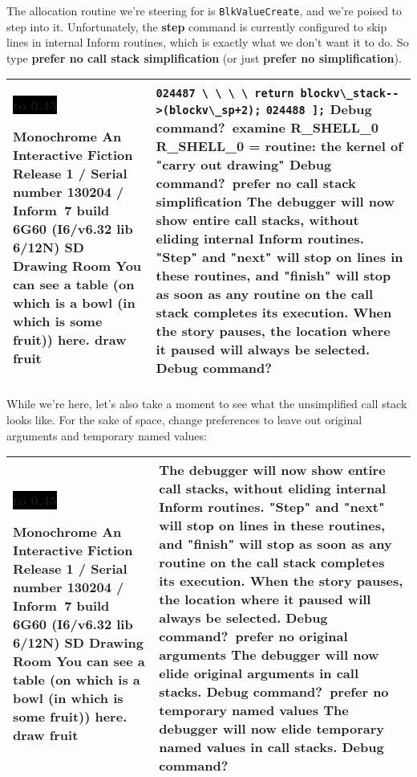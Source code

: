 \documentclass{book}
\newcommand{\n}{\hspace*{\fill}\newline}
\newcommand{\terp}[2]{\begin{center}\begin{tabular}{p{0.45\textwidth}|p{0.45\textwidth}}\midrule #1&#2\\\midrule\end{tabular}\end{center}}
\newcommand{\glkheading}[1]{\textbf{#1}}
\newcommand{\glkinput}[1]{\textbf{#1}}
\newcommand{\glkstatusline}[2]{\centerline{\colorbox{black}{\hbox to 0.45\textwidth{\textcolor{white}{#1\hfil #2}}}}}
\newcommand{\storyprompt}{\raisebox{1.5pt}{\(>\)}}
\newcommand{\cursor}{\raisebox{-1.5pt}{\RectangleThin}}
\newcommand{\unmarkedindent}{\hphantom{\(>\)}\qquad}
\newcommand{\unmarkedindentb}{\qquad\hphantom{\(>\)}}
\begin{document}
The allocation routine we're steering for is \lstinline{BlkValueCreate}, and
we're poised to step into it.  Unfortunately, the \glkinput{step} command is
currently configured to skip lines in internal Inform routines, which is exactly
what we don't want it to do.  So type \glkinput{prefer no call stack
  simplification} (or just \glkinput{prefer no simplification}).

\terp{\glkstatusline{Drawing Room}{0/1}\n
  \glkheading{Monochrome}\n
  An Interactive Fiction\n
  Release 1 / Serial number 130204 / Inform~7 build 6G60 (I6/v6.32 lib 6/12N) SD\n
  \n
  \glkheading{Drawing Room}\n
  You can see a table (on which is a bowl (in which is some fruit)) here.\n
  \n
  \storyprompt\glkinput{draw fruit}}{%
  \unmarkedindentb \lstinline{024487 \ \ \ \ return blockv\_stack-->(blockv\_sp+2);}\n
  \unmarkedindent \lstinline{024488 ];}\n
  \n
  Debug command?\ \glkinput{examine R\_SHELL\_0}\n
  \n
  R\_SHELL\_0 = routine: the kernel of "carry out drawing"\n
  \n
  Debug command?\ \glkinput{prefer no call stack simplification}\n
  \n
  The debugger will now show entire call stacks, without eliding internal Inform routines.  "Step" and "next" will stop on lines in these routines, and "finish" will stop as soon as any routine on the call stack completes its execution.  When the story pauses, the location where it paused will always be selected.\n
  \n
  Debug command?\ \cursor}

While we're here, let's also take a moment to see what the unsimplified call
stack looks like.  For the sake of space, change preferences to leave out
original arguments and temporary named values:

\terp{\glkstatusline{Drawing Room}{0/1}\n
  \glkheading{Monochrome}\n
  An Interactive Fiction\n
  Release 1 / Serial number 130204 / Inform~7 build 6G60 (I6/v6.32 lib 6/12N) SD\n
  \n
  \glkheading{Drawing Room}\n
  You can see a table (on which is a bowl (in which is some fruit)) here.\n
  \n
  \storyprompt\glkinput{draw fruit}}{%
  The debugger will now show entire call stacks, without eliding internal Inform routines.  "Step" and "next" will stop on lines in these routines, and "finish" will stop as soon as any routine on the call stack completes its execution.  When the story pauses, the location where it paused will always be selected.\n
  \n
  Debug command?\ \glkinput{prefer no original arguments}\n
  \n
  The debugger will now elide original arguments in call stacks.\n
  \n
  Debug command?\ \glkinput{prefer no temporary named values}\n
  \n
  The debugger will now elide temporary named values in call stacks.\n
  \n
  Debug command?\ \cursor}
\end{document}

